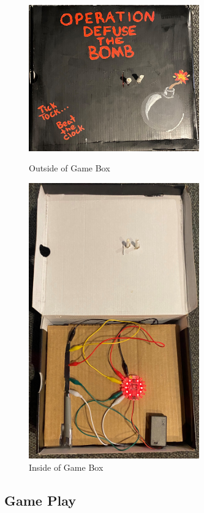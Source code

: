 \documentclass[12pt]{article}
\begin{document}
\begin{figure}[ht!]
\centering
\begin{minipage}{.5\textwidth}
  \centering
  \includegraphics[width=2.9in]{img1.jpg}
  \caption{Outside of Game Box}
  \label{fig:outside}
\end{minipage}%
\begin{minipage}{.5\textwidth}
  \centering
  \includegraphics[width=2.9in]{img2.jpg}
  \caption{Inside of Game Box}
  \label{fig:inside}
\end{minipage}
\end{figure}
\newpage

\subsection{Game Play}
\end{document}
